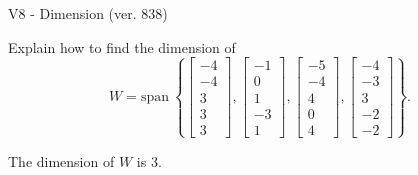 \begin{exercise}
  \begin{exerciseTitle}V8 - Dimension (ver. 838)\end{exerciseTitle}
  \begin{exerciseStatement}
    Explain how to find the dimension of 
\[W=\mathrm{span}\ \left\{\left[\begin{array}{r}
-4 \\
-4 \\
3 \\
3 \\
3
\end{array}\right] , \left[\begin{array}{r}
-1 \\
0 \\
1 \\
-3 \\
1
\end{array}\right] , \left[\begin{array}{r}
-5 \\
-4 \\
4 \\
0 \\
4
\end{array}\right] , \left[\begin{array}{r}
-4 \\
-3 \\
3 \\
-2 \\
-2
\end{array}\right]\right\}.\]



  \end{exerciseStatement}
  \begin{exerciseAnswer}
   The dimension of \(W\) is  \(3\).
  


  \end{exerciseAnswer}
\end{exercise}